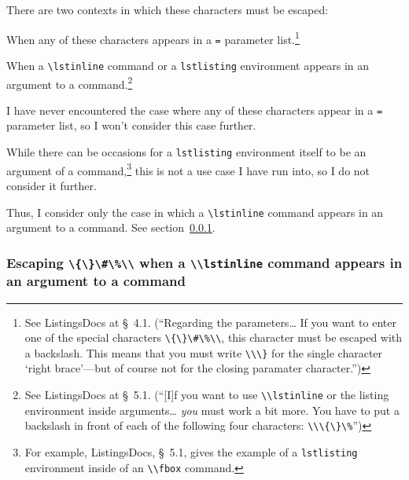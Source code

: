 \documentclass[12pt,table,final]{article}%
\DeclareRobustCommand{\escapableCharactersJdrLst}{\lstinline|\{\}\#\%\\|\xspace}
\begin{document}
There are two contexts in which these characters must be escaped:
\begin{jdr_itemize}
  \item When any of these characters appears in a \lstinline|=| parameter list.\footnote{See ListingsDocs at §~4.1. (``Regarding the parameters… If you want to enter one of the special characters \lstinline|\{\}\#\%\\|, this character must be escaped with a backslash. This means that you must write \lstinline|\\\}| for the single character `right brace'---but of course not for the closing paramater character.'')}
  \item When a \lstinline$\lstinline$ command or a \lstinline|lstlisting| environment appears in an argument to a command.\footnote{See ListingsDocs at §~5.1. (``[I]f you want to use \lstinline|\\lstinline| or the listing environment inside arguments… \emph{you} must work a bit more. You have to put a backslash in front of each of the following four characters: \lstinline|\\\{\}\%|'')}
\end{jdr_itemize}

I have never encountered the case where any of these characters appear in a \lstinline|=| parameter list, so I won't consider this case further. 

While there can  be occasions for a \lstinline|lstlisting| environment itself to be an argument of a command,\footnote{For example, ListingsDocs, §~5.1, gives the example of a \lstinline|lstlisting| environment inside of an \lstinline|\\fbox| command.} this is not a use case I have run into, so I do not consider it further.

Thus, I consider only the case in which a \lstinline|\lstinline| command appears in an argument to a command. See section~\ref{section:escapeCertainCharactersInsideArgument}.

\subsubsection{Escaping \escapableCharactersJdrLst when a \lstinline$\\lstinline$ command appears in an argument to a command}
\label{section:escapeCertainCharactersInsideArgument}
\end{document}
